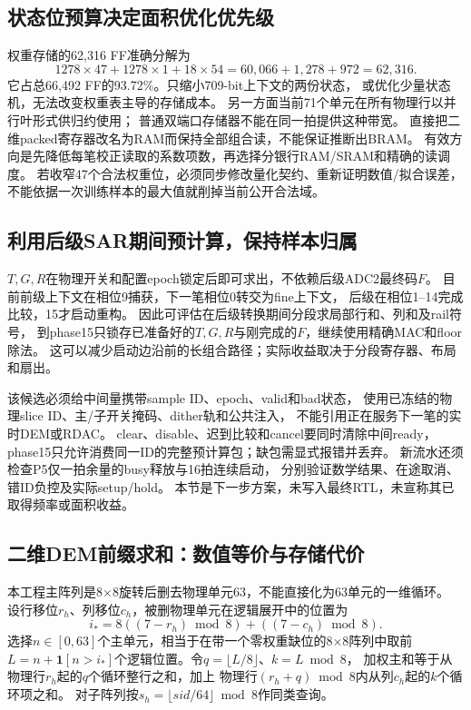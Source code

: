 \subsection{状态位预算决定面积优化优先级}
权重存储的62,316 FF准确分解为
\begin{equation}
1278\times47+1278\times1+18\times54
=60,066+1,278+972=62,316.
\end{equation}
它占总66,492 FF的93.72\%。只缩小709-bit上下文的两份状态，
或优化少量状态机，无法改变权重表主导的存储成本。
另一方面当前71个单元在所有物理行以并行叶形式供归约使用；
普通双端口存储器不能在同一拍提供这种带宽。
直接把二维packed寄存器改名为RAM而保持全部组合读，不能保证推断出BRAM。
有效方向是先降低每笔校正读取的系数项数，再选择分银行RAM/SRAM和精确的读调度。
若收窄47个合法权重位，必须同步修改量化契约、重新证明数值/拟合误差，
不能依据一次训练样本的最大值就削掉当前公开合法域。

\subsection{利用后级SAR期间预计算，保持样本归属}
\(T,G,R\)在物理开关和配置epoch锁定后即可求出，不依赖后级ADC2最终码\(F\)。
目前前级上下文在相位9捕获，下一笔相位0转交为fine上下文，
后级在相位1--14完成比较，15才启动重构。
因此可评估在后级转换期间分段求局部行和、列和及rail符号，
到phase15只锁存已准备好的\(T,G,R\)与刚完成的\(F\)，继续使用精确MAC和floor除法。
这可以减少启动边沿前的长组合路径；实际收益取决于分段寄存器、布局和扇出。

该候选必须给中间量携带sample ID、epoch、valid和bad状态，
使用已冻结的物理slice ID、主/子开关掩码、dither轨和公共注入，
不能引用正在服务下一笔的实时DEM或RDAC。
clear、disable、迟到比较和cancel要同时清除中间ready，
phase15只允许消费同一ID的完整预计算包；缺包需显式报错并丢弃。
新流水还须检查P5仅一拍余量的busy释放与16拍连续启动，
分别验证数学结果、在途取消、错ID负控及实际setup/hold。
本节是下一步方案，未写入最终RTL，未宣称其已取得频率或面积收益。

\subsection{二维DEM前缀求和：数值等价与存储代价}
本工程主阵列是8\(\times\)8旋转后删去物理单元63，不能直接化为63单元的一维循环。
设行移位\(r_h\)、列移位\(c_h\)，被删物理单元在逻辑展开中的位置为
\begin{equation}
i_*=8((7-r_h)\bmod8)+((7-c_h)\bmod8).
\end{equation}
选择\(n\in[0,63]\)个主单元，相当于在带一个零权重缺位的8\(\times\)8阵列中取前
\(L=n+\mathbf1[n>i_*]\)个逻辑位置。令\(q=\lfloor L/8\rfloor\)、\(k=L\bmod8\)，
加权主和等于从物理行\(r_h\)起的\(q\)个循环整行之和，加上
物理行\((r_h+q)\bmod8\)内从列\(c_h\)起的\(k\)个循环项之和。
对子阵列按\(s_h=\lfloor sid/64\rfloor\bmod8\)作同类查询。

